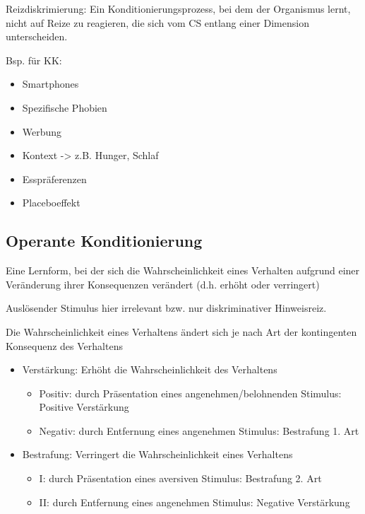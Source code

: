 Reizdiskrimierung: Ein Konditionierungsprozess, bei dem der Organismus lernt, nicht auf Reize zu reagieren, die sich vom CS entlang einer Dimension unterscheiden.

Bsp. für KK:
\begin{itemize}
	\item Smartphones
	\item Spezifische Phobien
	\item Werbung
	\item Kontext -> z.B. Hunger, Schlaf 
 	\item Esspräferenzen
 	\item Placeboeffekt
\end{itemize}

\subsection{Operante Konditionierung}
Eine Lernform, bei der sich die Wahrscheinlichkeit eines Verhalten aufgrund einer Veränderung ihrer Konsequenzen verändert (d.h. erhöht oder verringert)

Auslösender Stimulus hier irrelevant bzw. nur diskriminativer Hinweisreiz.

Die Wahrscheinlichkeit eines Verhaltens ändert sich je nach Art der kontingenten Konsequenz des
Verhaltens
\begin{itemize}
	\item Verstärkung: Erhöht die Wahrscheinlichkeit des Verhaltens
		\begin{itemize}
			\item Positiv: durch Präsentation eines angenehmen/belohnenden Stimulus: Positive Verstärkung
			\item Negativ: durch Entfernung eines angenehmen Stimulus: Bestrafung 1. Art
		\end{itemize}
	\item Bestrafung: Verringert die Wahrscheinlichkeit eines Verhaltens
		\begin{itemize}
			\item I: durch Präsentation eines aversiven Stimulus: Bestrafung 2. Art 
			\item II: durch Entfernung eines angenehmen Stimulus: Negative Verstärkung
		\end{itemize}
\end{itemize}
